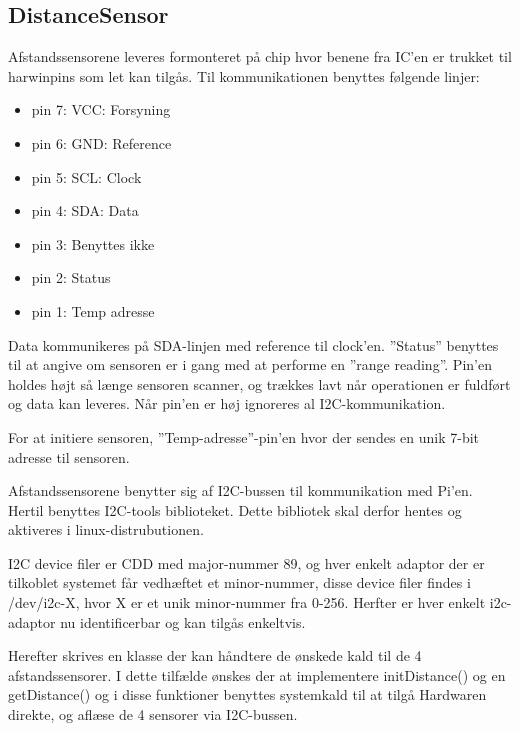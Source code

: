 \subsection{DistanceSensor}

Afstandssensorene leveres formonteret på chip hvor benene fra IC'en er trukket til harwinpins som let kan tilgås. Til kommunikationen benyttes følgende linjer: 

\begin{itemize}
	\item pin 7: VCC: Forsyning
	\item pin 6: GND: Reference
	\item pin 5: SCL: Clock
	\item pin 4: SDA: Data
	\item pin 3: Benyttes ikke
	\item pin 2: Status
	\item pin 1: Temp adresse 
\end{itemize}

Data kommunikeres på SDA-linjen med reference til clock'en. ''Status'' benyttes til at angive om sensoren er i gang med at performe en ''range reading''. 
Pin'en holdes højt så længe sensoren scanner, og trækkes lavt når operationen er fuldført og data kan leveres. Når pin'en er høj ignoreres al I2C-kommunikation.

For at initiere sensoren, ''Temp-adresse''-pin'en hvor der sendes en unik 7-bit adresse til sensoren.
   
Afstandssensorene benytter sig af I2C-bussen til kommunikation med Pi'en. Hertil benyttes I2C-tools biblioteket.
Dette bibliotek skal derfor hentes og aktiveres i linux-distrubutionen.

I2C device filer er CDD med major-nummer 89, og hver enkelt adaptor der er tilkoblet systemet får vedhæftet et minor-nummer, 
disse device filer findes i /dev/i2c-X, hvor X er et unik minor-nummer fra 0-256. Herfter er hver enkelt i2c-adaptor nu identificerbar og kan tilgås enkeltvis. 

Herefter skrives en klasse der kan håndtere de ønskede kald til de 4 afstandssensorer. 
I dette tilfælde ønskes der at implementere initDistance() og en getDistance() og i disse funktioner benyttes systemkald til at tilgå Hardwaren direkte, og aflæse de 4 sensorer via I2C-bussen.